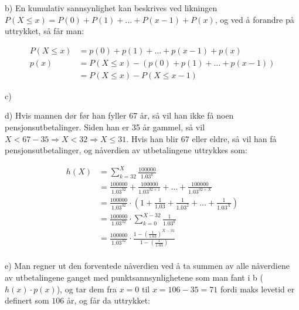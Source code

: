 \documentclass[12pt, a4paper]{article}
\begin{document}
b) En kumulativ sannsynlighet kan beskrives ved likningen $P(X \leq x) = P(0) + P(1) + \dots + P(x-1) + P(x)$, og ved å forandre på uttrykket, så får man:

\begin{equation}
    \begin{split}
        P(X \leq x) &= p(0) + p(1) + \dots + p(x-1) + p(x) \\
               p(x) &= P(X \leq x) - (p(0) + p(1) + \dots + p(x-1)) \\
                    &= P(X \leq x) - P(X \leq x - 1)
    \end{split}
\end{equation}

\newpage

c)



\newpage

d) 
Hvis mannen dør før han fyller 67 år, så vil han ikke få noen pensjonsutbetalinger. Siden han er 35 år gammel, så vil $X < 67 - 35 \Rightarrow X < 32 \Rightarrow X \leq 31$.
Hvis han blir 67 eller eldre, så vil han få pensjonsutbetalinger, og nåverdien av utbetalingene uttrykkes som:

\begin{equation}
    \begin{split}
        h(X) &= \sum_{k=32}^X \frac{100000}{1.03^k} \\
             &= \frac{100000}{1.03^{32}} + \frac{100000}{1.03^{32+1}} + \dots + \frac{100000}{1.03^{32+X}} \\
             &= \frac{100000}{1.03^{32}} \cdot (1 + \frac{1}{1.03} + \frac{1}{1.03^2} + \dots + \frac{1}{1.03^X}) \\
             &= \frac{100000}{1.03^{32}} \cdot \sum_{k=0}^{X-32} \frac{1}{1.03^k} \\
             &= \frac{100000}{1.03^{32}} \cdot \frac{1 - (\frac{1}{1.03})^{X-31}}{1 - (\frac{1}{1.03})} \\
    \end{split}
\end{equation}

\newpage

e)
Man regner ut den forventede nåverdien ved å ta summen av alle nåverdiene av utbetalingene ganget med punktsannsynlighetene
som man fant i b ($h(x) \cdot p(x)$), og tar dem fra $x = 0$ til $x = 106 - 35 = 71$ fordi maks levetid er definert som $106$ år, og får da uttrykket:
\end{document}
